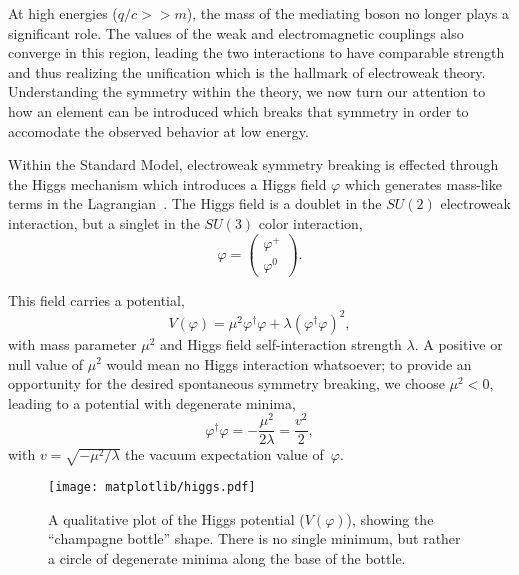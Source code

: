 At high energies ($q/c >> m$), the mass of the mediating boson no longer plays a significant role.  The values of the weak and electromagnetic couplings also converge in this region, leading the two interactions to have comparable strength and thus realizing the unification which is the hallmark of electroweak theory.  Understanding the symmetry within the theory, we now turn our attention to how an element can be introduced which breaks that symmetry in order to accomodate the observed behavior at low energy.

Within the Standard Model, electroweak symmetry breaking is effected through the Higgs mechanism which introduces a Higgs field $\varphi$ which generates mass-like terms in the Lagrangian~\cite{PhysRevLett.13.508,PhysRevLett.13.321,PhysRevLett.13.585}.  The Higgs field is a doublet in the $SU(2)$ electroweak interaction, but a singlet in the $SU(3)$ color interaction,
\begin{equation}
  \varphi = \left(\begin{array}{c}\varphi^+ \\ \varphi^0\end{array}\right).
\end{equation}

This field carries a potential,
\begin{equation}
  V(\varphi) = \mu^2\varphi^\dagger\varphi + \lambda(\varphi^\dagger\varphi)^2,
\end{equation}
with mass parameter $\mu^2$ and Higgs field self-interaction strength $\lambda$.  A positive or null value of $\mu^2$ would mean no Higgs interaction whatsoever; to provide an opportunity for the desired spontaneous symmetry breaking, we choose $\mu^2 < 0$, leading to a potential with degenerate minima,
\begin{equation}
  \varphi^\dagger\varphi = -\frac{\mu^2}{2\lambda} = \frac{v^2}{2},
\end{equation}
with $v=\sqrt{-\mu^2/\lambda}$ the vacuum expectation value of~$\varphi$.

\begin{figure}
\centering
\texttt{[image: matplotlib/higgs.pdf]}
\caption[The Higgs potential]{A qualitative plot of the Higgs potential ($V(\varphi)$), showing the ``champagne bottle'' shape.  There is no single minimum, but rather a circle of degenerate minima along the base of the bottle.}
\label{higgs-potential}
\end{figure}


